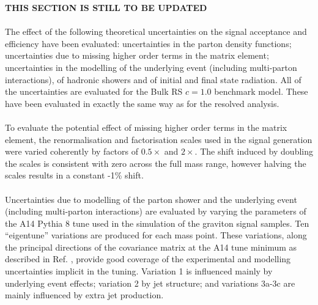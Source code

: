 \textbf{THIS SECTION IS STILL TO BE UPDATED}
\paragraph{}
The effect of the following theoretical uncertainties on the signal acceptance and efficiency have been evaluated: uncertainties in the parton density functions; uncertainties due to missing higher order terms in the matrix element; uncertainties in the modelling of the underlying event (including multi-parton interactions), of hadronic showers and of initial and final state radiation. All of the uncertainties are evaluated for the Bulk RS $c=1.0$ benchmark model. These have been evaluated in exactly the same way as for the resolved analysis.%

\paragraph{}
To evaluate the potential effect of missing higher order terms in the matrix element, the renormalisation and factorisation scales used in the signal generation were varied coherently by factors of $0.5\times$ and $2\times$. 
The shift induced by doubling the scales is consistent with zero across the full mass range, however halving the scales results in a constant -1\% shift. %


\paragraph{}
Uncertainties due to modelling of the parton shower and the underlying event (including multi-parton interactions) are evaluated by varying the parameters of the A14 Pythia 8 tune used in the simulation of the graviton signal samples. Ten ``eigentune'' variations are produced for each mass point. These variations, along the principal directions of the covariance matrix at the A14 tune minimum as described in Ref. \cite{ATL-PHYS-PUB-2014-021}, provide good coverage of the experimental and modelling uncertainties implicit in the tuning. Variation 1 is influenced mainly by underlying event effects; variation 2 by jet structure; and variations 3a-3c are mainly influenced by extra jet production. 

